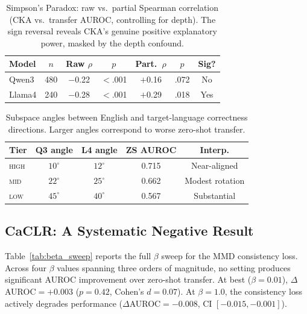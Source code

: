 \documentclass[11pt,a4paper]{article}
\newcommand{\auroc}{AUROC}
\begin{document}
\begin{table}[t]
\centering
\small
\begin{tabular}{lcccccc}
\toprule
Model & $n$ & Raw $\rho$ & $p$ & Part.\ $\rho$ & $p$ & Sig? \\
\midrule
Qwen3 & 480 & $-$0.22 & $<$.001 & $+$0.16 & .072 & No \\
Llama4 & 240 & $-$0.28 & $<$.001 & $+$0.29 & .018 & Yes \\
\bottomrule
\end{tabular}
\caption{Simpson's Paradox: raw vs.\ partial Spearman correlation (CKA vs.\ transfer \auroc{}, controlling for depth). The sign reversal reveals CKA's genuine positive explanatory power, masked by the depth confound.}
\label{tab:simpson}
\end{table}

\begin{table}[t]
\centering
\small
\begin{tabular}{lcccc}
\toprule
Tier & Q3 angle & L4 angle & ZS \auroc{} & Interp. \\
\midrule
\textsc{high} & $10^\circ$ & $12^\circ$ & 0.715 & Near-aligned \\
\textsc{mid}  & $22^\circ$ & $25^\circ$ & 0.662 & Modest rotation \\
\textsc{low}  & $45^\circ$ & $40^\circ$ & 0.567 & Substantial \\
\bottomrule
\end{tabular}
\caption{Subspace angles between English and target-language correctness directions. Larger angles correspond to worse zero-shot transfer.}
\label{tab:subspace}
\end{table}


\subsection{CaCLR: A Systematic Negative Result}
\label{sec:caclr}

Table~\ref{tab:beta_sweep} reports the full $\beta$ sweep for the MMD consistency loss. Across four $\beta$ values spanning three orders of magnitude, no setting produces significant \auroc{} improvement over zero-shot transfer. At best ($\beta=0.01$), $\Delta$\auroc{}$=+0.003$ ($p=0.42$, Cohen's $d=0.07$). At $\beta=1.0$, the consistency loss actively degrades performance ($\Delta$\auroc{}$=-0.008$, CI $[-0.015, -0.001]$).
\end{document}
